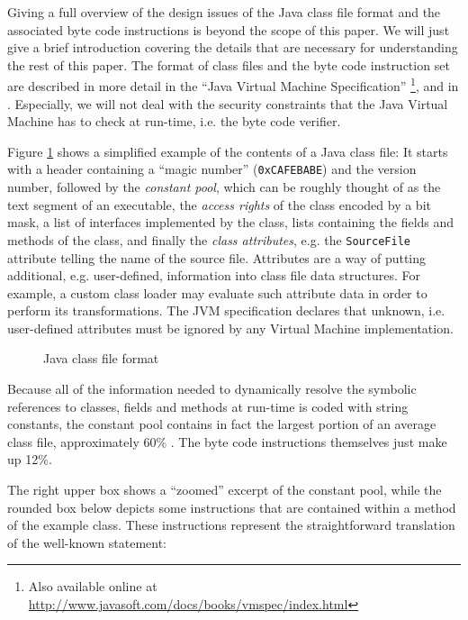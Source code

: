 \documentclass[12pt,twoside]{article}
\newcommand\cp{{constant pool }}
\newcommand\cpe{constant pool}
\newcommand\jvm{{Java Virtual Machine }}
\newcommand\vm{{Virtual Machine }}
\begin{document}
Giving a  full overview of  the design issues  of the Java  class file
format and the  associated byte code instructions is  beyond the scope
of this paper.   We will just give a  brief introduction covering the
details  that  are  necessary  for  understanding  the  rest  of  this
paper. The format of class files and the byte code instruction set are
described  in more  detail  in the  ``\jvm Specification''  \cite{jvm}
\footnote{Also             available             online             at
\url{http://www.javasoft.com/docs/books/vmspec/index.html}},   and  in
\cite{jasmin}.   Especially,  we  will  not  deal  with  the  security
constraints that the \jvm has to check at run-time, i.e. the byte code
verifier.

Figure \ref{fig:classfile} shows a  simplified example of the contents
of a  Java class file:  It starts with  a header containing  a ``magic
number'' (\texttt{0xCAFEBABE}) and the version number, followed by the
\emph{\cpe}, which can be roughly thought of as the text segment of an
executable, the  \emph{access rights}  of the class  encoded by  a bit
mask, a list of interfaces  implemented by the class, lists containing
the  fields and  methods of  the  class, and  finally the  \emph{class
attributes}, e.g.  the  \texttt{SourceFile} attribute telling the name
of  the source  file.  Attributes  are  a way  of putting  additional,
e.g. user-defined,  information into class file  data structures.  For
example, a  custom class  loader may evaluate  such attribute  data in
order to perform its  transformations.  The JVM specification declares
that unknown, i.e.  user-defined attributes must be ignored by any \vm
implementation.

\begin{figure}[htbp]
  \begin{center}
    \leavevmode
    \epsfxsize\textwidth
    \caption{Java class file format}
    \label{fig:classfile}
  \end{center}
\end{figure}

Because  all of  the  information needed  to  dynamically resolve  the
symbolic  references to  classes, fields  and methods  at  run-time is
coded  with string  constants, the  \cp contains  in fact  the largest
portion of an average class file, approximately 60\% \cite{statistic}.
The byte code instructions themselves just make up 12\%.

The right upper box shows a  ``zoomed'' excerpt of the \cpe, while the
rounded box below depicts  some instructions that are contained within
a  method  of the  example  class.  These  instructions represent  the
straightforward translation of the well-known statement:
\end{document}
